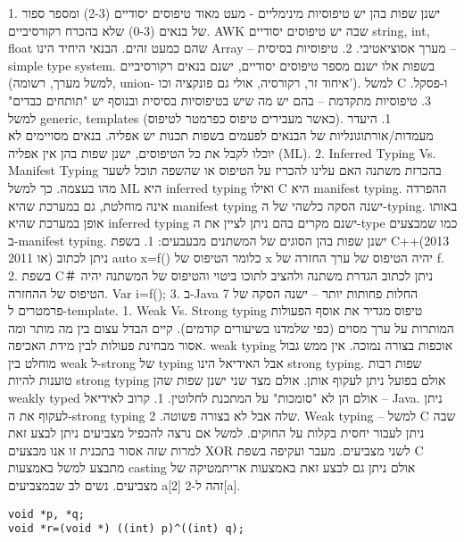       1. ישנן שפות בהן יש טיפוסיות מינימליים - מעט מאוד טיפוסים יסודיים (2-3) ומספר ספור של בנאים (0-3) שלא בהכרח רקורסיביים.
      AWK שבה יש טיפוסים יסודיים string, int, float שהם כמעט זהים.
      הבנאי היחיד הינו Array – מערך אסוציאטיבי.
      2. טיפוסיות בסיסית – simple type system. בשפות אלו ישנם מספר טיפוסים יסודיים, ישנם בנאים רקורסיביים (למשל מערך, רשומה, union- איחוד זר, רקורסיה, אולי גם פונקציה וכו'). למשל C ו-פסקל.
      3. טיפוסיות מתקדמת – בהם יש מה שיש בטיפוסיות בסיסית ובנוסף יש "תותחים כבדים" למשל generic, templates (כאשר מעבירים טיפוס כפרמטר לטיפוס).
      1. היעדר מעמדות/אורתוגונליות של הבנאים לפעמים בשפות תכנות יש אפליה. בנאים מסויימים לא יוכלו לקבל את כל הטיפוסים, ישנן שפות בהן אין אפליה (ML).
      2. Inferred Typing Vs. Manifest Typing בהכרזת משתנה האם עלינו להכריז על הטיפוס או שהשפה תוכל לשער מהו בעצמה. כך למשל ML היא inferred typing ואילו C היא manifest typing. ההפרדה אינה מוחלטת, גם במערכת שהיא manifest typing ישנה הסקה כלשהי של ה-typing. באותו אופן במערכת שהיא inferred typing ישנם מקרים בהם ניתן לציין את ה-type כמו שמבצעים ב-manifest typing.
      ישנן שפות בהן הסוגים של המשתנים מבעבעים:
      1. בשפת C++(2013 או 2011) ניתן לכתוב auto x=f() כלומר הטיפוס של x יהיה הטיפוס של ערך החזרה של f.
      2. בשפת C＃ ניתן לכתוב הגדרת משתנה ולהציב לתוכו ביטוי והטיפוס של המשתנה יהיה הטיפוס של ההחזרה. Var i=f();
      3. ב-Java 7 החלות פחותות יותר – ישנה הסקה של פרמטרים ל-template.
      1. Weak Vs. Strong typing טיפוס מגדיר את אוסף הפעולות המותרות על ערך מסוים (כפי שלמדנו בשיעורים קודמים). קיים הבדל עצום בין מה מותר ומה אסור מבחינת פעולות לבין מידת האכיפה.
      weak typing אוכפות בצורה נמוכה. אין ממש גבול מוחלט בין weak ל-strong של typing אבל האידיאל הינו strong typing.
      שפות רבות טוענות להיות strong typing אולם בפועל ניתן לעקוף אותן. אולם מצד שני ישנן שפות שהן weakly typed אולם הן לא "סומכות" על המתכנת לחלוטין.
      1. קרוב לאידיאל – Java. ניתן לעקוף את ה-strong typing שלה אבל לא בצורה פשוטה.
      2. Weak typing – למשל C שבה ניתן לעבור יחסית בקלות על החוקים. למשל אם נרצה להכפיל מצביעים ניתן לבצע זאת למרות שזה אסור
      בתכנית זו אנו מבצעים XOR לשני מצביעים.
      מעבר ועקיפה בשפת C מתבצע למשל באמצעות casting אולם ניתן גם לבצע זאת באמצעות אריתמטיקה של מצביעים. נשים לב שבמצביעים a[2] זהה ל-2[a].

\begin{verbatim}
void *p, *q;
void *r=(void *) ((int) p)^((int) q);
\end{verbatim}


